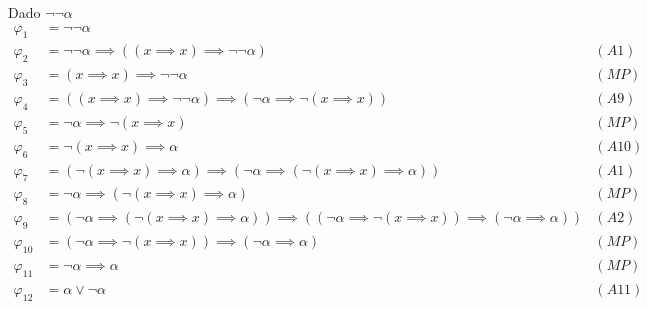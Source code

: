\begin{sol}
    Dado $\neg\neg\alpha$
    \begin{align*}
        \varphi_1    & = \neg\neg\alpha                                                                                                                                 \\
        \varphi_2    & = \neg\neg\alpha\implies((x\implies x)\implies \neg\neg\alpha)                                                                           & (A1)  \\
        \varphi_3    & = (x\implies x)\implies\neg\neg\alpha                                                                                                    & (MP)  \\
        \varphi_4    & = ((x\implies x)\implies\neg\neg\alpha)\implies(\neg\alpha\implies\neg(x\implies x))                                                     & (A9)  \\
        \varphi_5    & = \neg\alpha\implies\neg(x\implies x)                                                                                                    & (MP)  \\
        \varphi_6    & = \neg(x\implies x)\implies\alpha                                                                                                        & (A10) \\
        \varphi_7    & = (\neg(x\implies x)\implies\alpha)\implies(\neg\alpha\implies(\neg(x\implies x)\implies\alpha))                                         & (A1)  \\
        \varphi_8    & = \neg\alpha\implies(\neg(x\implies x)\implies\alpha)                                                                                    & (MP)  \\
        \varphi_9    & = (\neg\alpha\implies(\neg(x\implies x)\implies\alpha))\implies((\neg\alpha\implies\neg(x\implies x))\implies(\neg\alpha\implies\alpha)) & (A2)  \\
        \varphi_{10} & = (\neg\alpha\implies\neg(x\implies x))\implies(\neg\alpha\implies\alpha)                                                                & (MP)  \\
        \varphi_{11} & = \neg\alpha\implies\alpha                                                                                                               & (MP)  \\
        \varphi_{12} & = \alpha\vee\neg\alpha                                                                                                                   & (A11) \\

\end{align*}
\end{sol}
